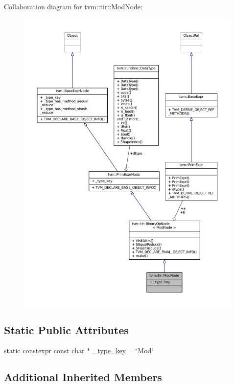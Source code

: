 Collaboration diagram for tvm\+:\+:tir\+:\+:Mod\+Node\+:
\nopagebreak
\begin{figure}[H]
\begin{center}
\leavevmode
\includegraphics[width=350pt]{classtvm_1_1tir_1_1ModNode__coll__graph}
\end{center}
\end{figure}
\subsection*{Static Public Attributes}
\begin{DoxyCompactItemize}
\item 
static constexpr const char $\ast$ \hyperlink{classtvm_1_1tir_1_1ModNode_a37e351d32690214154bd1545b990f43a}{\+\_\+type\+\_\+key} = \char`\"{}Mod\char`\"{}
\end{DoxyCompactItemize}
\subsection*{Additional Inherited Members}


